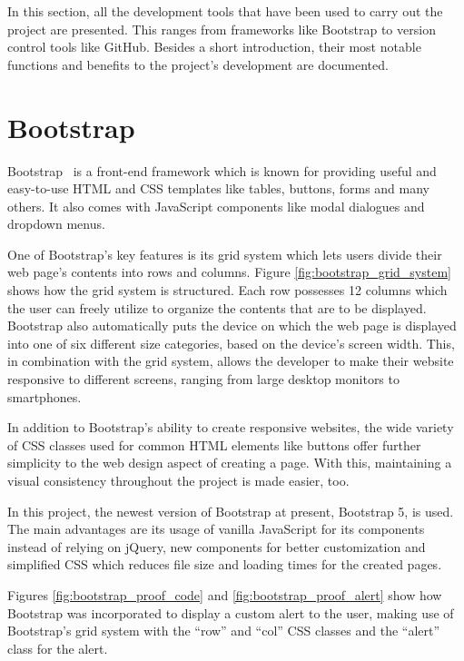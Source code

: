 
In this section, all the development tools that have been used to carry out the project are presented. This ranges from frameworks like Bootstrap to version control tools like GitHub. Besides a short introduction, their most notable functions and benefits to the project's development are documented.

\section{Bootstrap}
Bootstrap~\cite{bootstrap5_tutorial} is a front-end framework which is known for providing useful and easy-to-use HTML and CSS templates like tables, buttons, forms and many others. It also comes with JavaScript components like modal dialogues and dropdown menus.

One of Bootstrap's key features is its grid system which lets users divide their web page's contents into rows and columns. Figure \ref{fig:bootstrap_grid_system} shows how the grid system is structured.
Each row possesses 12 columns which the user can freely utilize to organize the contents that are to be displayed. Bootstrap also automatically puts the device on which the web page is displayed into one of six different size categories, based on the device's screen width. This, in combination with the grid system, allows the developer to make their website responsive to different screens, ranging from large desktop monitors to smartphones.

In addition to Bootstrap's ability to create responsive websites, the wide variety of CSS classes used for common HTML elements like buttons offer further simplicity to the web design aspect of creating a page. With this, maintaining a visual consistency throughout the project is made easier, too.

In this project, the newest version of Bootstrap at present, Bootstrap 5, is used. The main advantages are its usage of vanilla JavaScript for its components instead of relying on jQuery, new components for better customization and simplified CSS which reduces file size and loading times for the created pages.

Figures \ref{fig:bootstrap_proof_code} and \ref{fig:bootstrap_proof_alert} show how Bootstrap was incorporated to display a custom alert to the user, making use of Bootstrap's grid system with the ``row'' and ``col'' CSS classes and the ``alert'' class for the alert.

